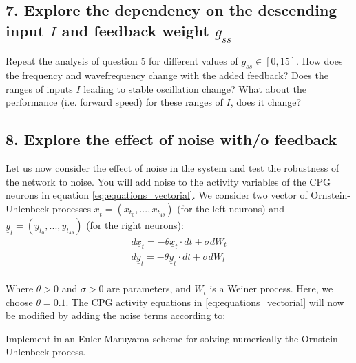 \documentclass{cmc}
\begin{document}


\subsection*{7. Explore the dependency on the descending input $I$ and feedback weight $g_{ss}$}\label{sec:ex7}
Repeat the analysis of question 5 for different values of $g_{ss} \in \left[0,15 \right]$. How does the frequency and wavefrequency change with the added feedback? Does the ranges of inputs $I$ leading to stable oscillation change? What about the performance (i.e. forward speed) for these ranges of $I$, does it change?





\subsection*{8. Explore the effect of noise with/o feedback}\label{sec:ex8}
Let us now consider the effect of noise in the system and test the robustness of the network to noise. You will add noise to the activity variables of the CPG neurons in equation \ref{eq:equations_vectorial}. We consider two vector of Ornstein-Uhlenbeck processes $\underline{x}_t = (x_{t_0},...,x_{t_{49}})$ (for the left neurons) and $\underline{y}_t = (y_{t_0},...,y_{t_{49}})$ (for the right neurons):
\begin{equation}
    \begin{array}{lcl}
	d\underline{x}_t = - \theta \underline{x}_t \cdot dt + \sigma dW_t\\
	d\underline{y}_t = - \theta \underline{y}_t \cdot dt + \sigma dW_t\\
    \end{array}
	\label{eq:ou_process}
\end{equation}

Where $\theta>0$ and $\sigma>0$ are parameters, and $W_t$ is a Weiner process. Here, we choose $\theta=0.1$. The CPG activity equations in \ref{eq:equations_vectorial} will now be modified by adding the noise terms according to:

Implement in  an Euler-Maruyama scheme for solving numerically the Ornstein-Uhlenbeck process.
\end{document}
